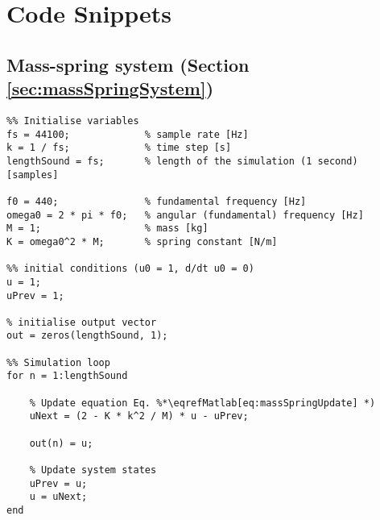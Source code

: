 \chapter{Code Snippets}
\renewcommand\thesection{\thechapter.\arabic{section}}

\section{Mass-spring system (Section \ref{sec:massSpringSystem})}\label{app:massSpringCode}

\setlstMAT
\begin{lstlisting}
%% Initialise variables
fs = 44100;             % sample rate [Hz]
k = 1 / fs;             % time step [s]
lengthSound = fs;       % length of the simulation (1 second) [samples]

f0 = 440;               % fundamental frequency [Hz]
omega0 = 2 * pi * f0;   % angular (fundamental) frequency [Hz]
M = 1;                  % mass [kg]
K = omega0^2 * M;       % spring constant [N/m]

%% initial conditions (u0 = 1, d/dt u0 = 0)
u = 1;                  
uPrev = 1;

% initialise output vector
out = zeros(lengthSound, 1);

%% Simulation loop
for n = 1:lengthSound
    
    % Update equation Eq. %*\eqrefMatlab[eq:massSpringUpdate] *)
    uNext = (2 - K * k^2 / M) * u - uPrev; 
    
    out(n) = u;
    
    % Update system states
    uPrev = u;
    u = uNext;
end    
\end{lstlisting}

